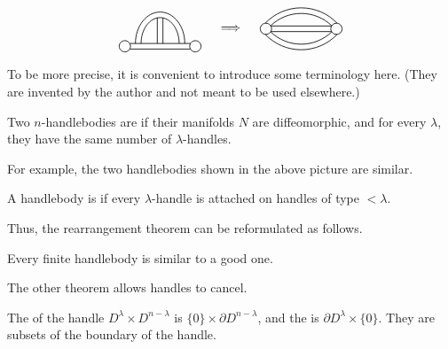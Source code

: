 \[ \begin{tikzpicture}[line width=.6]
    \draw (0,0) circle (.16);
    \draw (2,0) circle (.16);
    \draw (.14,.08) -- (1.86,.08) (.14,-.08) -- (1.86,-.08);
    \draw (.3,.08) arc (180 : 0 : .7 and .9);
    \draw (.46,.08) arc (180 : 0 : .54 and .74);
    \draw (.92,.08) -- (.92,.82) (1.08,.08) -- (1.08,.82);

    \node at (3,.5) {\text{$\Longrightarrow$}};

    \draw (4,.5) circle (.16);
    \draw (6,.5) circle (.16);
    \draw (4.14,.58) -- (5.86,.58) (4.14,.42) -- (5.86,.42);
    \draw (5,1.1) arc (90 : 137 : 1.4);
    \draw (5,1.1) arc (90 : 43 : 1.4);
    \draw (5,.94) arc (90 : 134 : 1.24);
    \draw (5,.94) arc (90 : 46 : 1.24);
    \draw (5,-.1) arc (-90 : -137 : 1.4);
    \draw (5,-.1) arc (-90 : -43 : 1.4);
    \draw (5,.06) arc (-90 : -134 : 1.24);
    \draw (5,.06) arc (-90 : -46 : 1.24);
\end{tikzpicture} \]

To be more precise,
it is convenient to introduce some terminology here.
(They are invented by the author and not meant to be used elsewhere.)

\begin{definition}
    Two $n$-handlebodies are 
    if their manifolds $N$ are diffeomorphic, and for every $\lambda$,
    they have the same number of $\lambda$-handles. \varqed
\end{definition}

For example, the two handlebodies shown in the above picture are similar.

\begin{definition}
    A handlebody is  if 
    every $\lambda$-handle is attached on handles of type $<\lambda$. \varqed
\end{definition}

Thus, the rearrangement theorem can be reformulated as follows.

{
    \def\thetheorem{\ref*{thm-rearrangement}′}
    \begin{theorem}[Rearrangement]
        Every finite handlebody is similar to a good one.
    \end{theorem}
    \addtocounter{theorem}{-1}
}

The other theorem allows handles to cancel.

\begin{definition}
    The  of the handle $D^\lambda \times D^{n-\lambda}$
    is $\{0\}\times \partial D^{n-\lambda}$,
    and the  is $\partial D^\lambda\times\{0\}$.
    They are subsets of the boundary of the handle. \varqed
\end{definition}

